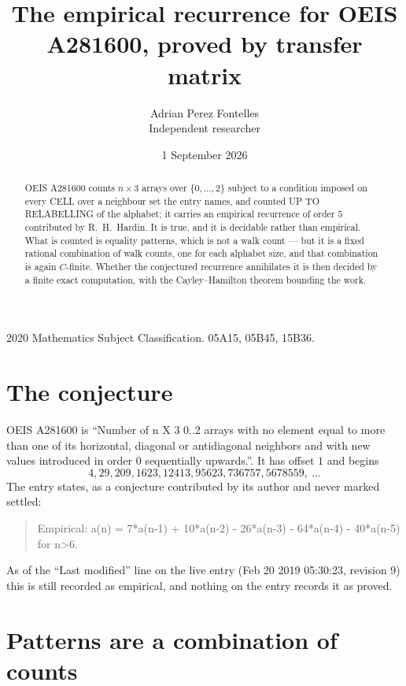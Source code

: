 \documentclass[11pt,a4paper]{article}
\title{The empirical recurrence for OEIS A281600, proved by transfer matrix}
\author{Adrian Perez Fontelles\\ \small Independent researcher}
\date{1 September 2026}
\theoremstyle{plain}
\theoremstyle{definition}
\begin{document}
\maketitle

\begin{abstract}
OEIS A281600 counts $n\times3$ arrays over $\{0,\dots,2\}$ subject to a condition imposed on
every CELL over a neighbour set the entry names, and counted UP TO RELABELLING of the
alphabet; it carries an empirical recurrence of order $5$ contributed by
R.~H.~Hardin. It is true, and it is decidable rather than empirical. What is counted is
equality patterns, which is not a walk count --- but it is a fixed rational combination of
walk counts, one for each alphabet size, and that combination is again $C$-finite. Whether the
conjectured recurrence annihilates it is then decided by a finite exact computation, with the
Cayley--Hamilton theorem bounding the work.
\end{abstract}

\noindent\small 2020 Mathematics Subject Classification. 05A15, 05B45, 15B36.\normalsize

\section{The conjecture}

OEIS A281600 is ``Number of n X 3 0..2 arrays with no element equal to more than one of its horizontal, diagonal or antidiagonal neighbors and with new values introduced in order 0 sequentially upwards.''. It has offset $1$ and begins
\[
4, 29, 209, 1623, 12413, 95623, 736757, 5678559,\ \dots
\]
The entry states, as a conjecture contributed by its author and never marked settled:
\begin{quote}
Empirical: a(n) = 7*a(n-1) + 10*a(n-2) - 26*a(n-3) - 64*a(n-4) - 40*a(n-5) for n>6.
\end{quote}
As of the ``Last modified'' line on the live entry (Feb 20 2019 05:30:23, revision 9) this is still
recorded as empirical, and nothing on the entry records it as proved.

\section{Patterns are a combination of counts}
\end{document}
